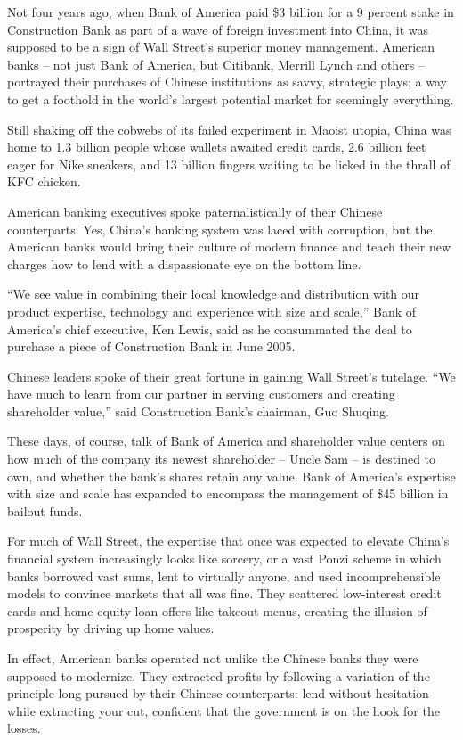 \documentclass[12pt,a4paper,onecolumn]{article}
\begin{document}
Not four years ago, when Bank of America paid \$3 billion for a 9 percent stake in Construction Bank
as part of a wave of foreign investment into China, it was supposed to be a sign of Wall Street's
superior money management. American banks -- not just Bank of America, but Citibank, Merrill Lynch
and others -- portrayed their purchases of Chinese institutions as savvy, strategic plays; a way to
get a foothold in the world's largest potential market for seemingly everything.

Still shaking off the cobwebs of its failed experiment in Maoist utopia, China was home to 1.3
billion people whose wallets awaited credit cards, 2.6 billion feet eager for Nike sneakers, and 13
billion fingers waiting to be licked in the thrall of KFC chicken.

American banking executives spoke paternalistically of their Chinese counterparts. Yes, China's
banking system was laced with corruption, but the American banks would bring their culture of modern
finance and teach their new charges how to lend with a dispassionate eye on the bottom line.

``We see value in combining their local knowledge and distribution with our product expertise,
technology and experience with size and scale,'' Bank of America's chief executive, Ken Lewis, said
as he consummated the deal to purchase a piece of Construction Bank in June 2005.

Chinese leaders spoke of their great fortune in gaining Wall Street's tutelage. ``We have much to
learn from our partner in serving customers and creating shareholder value,'' said Construction
Bank's chairman, Guo Shuqing.

These days, of course, talk of Bank of America and shareholder value centers on how much of the
company its newest shareholder -- Uncle Sam -- is destined to own, and whether the bank's shares
retain any value. Bank of America's expertise with size and scale has expanded to encompass the
management of \$45 billion in bailout funds.

For much of Wall Street, the expertise that once was expected to elevate China's financial system
increasingly looks like sorcery, or a vast Ponzi scheme in which banks borrowed vast sums, lent to
virtually anyone, and used incomprehensible models to convince markets that all was fine. They
scattered low-interest credit cards and home equity loan offers like takeout menus, creating the
illusion of prosperity by driving up home values.

In effect, American banks operated not unlike the Chinese banks they were supposed to modernize.
They extracted profits by following a variation of the principle long pursued by their Chinese
counterparts: lend without hesitation while extracting your cut, confident that the government is on
the hook for the losses.
\end{document}
